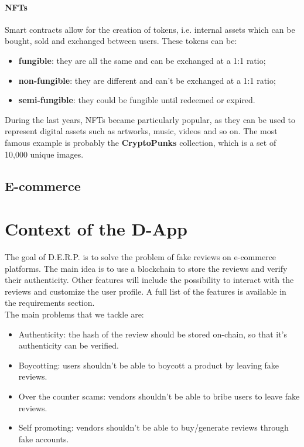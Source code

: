 \documentclass[12pt,a4paper,oneside]{article}
\theoremstyle{definition}
\begin{document}
\paragraph{NFTs} Smart contracts allow for the creation of tokens, i.e. internal assets which can be bought, sold and exchanged between users. These tokens can be:
\begin{itemize}
  \item \textbf{fungible}: they are all the same and can be exchanged at a 1:1 ratio;
  \item \textbf{non-fungible}: they are different and can't be exchanged at a 1:1 ratio;
  \item \textbf{semi-fungible}: they could be fungible until redeemed or expired.
\end{itemize}
During the last years, NFTs became particularly popular, as they can be used to represent digital assets such as artworks, music, videos and so on. The most famous example is probably the \textbf{CryptoPunks} collection, which is a set of 10,000 unique images.\\


\subsection{E-commerce}

\section{Context of the D-App}
The goal of D.E.R.P. is to solve the problem of fake reviews on e-commerce platforms. The main idea is to use a blockchain to store the reviews and verify their authenticity. Other features will include the possibility to interact with the reviews and customize the user profile. A full list of the features is available in the requirements section. \\
The main problems that we tackle are:
\begin{itemize}
	\item Authenticity: the hash of the review should be stored on-chain, so that it's authenticity can be verified.
	\item Boycotting: users shouldn't be able to boycott a product by leaving fake reviews.
	\item Over the counter scams: vendors shouldn't be able to bribe users to leave fake reviews.
	\item Self promoting: vendors shouldn't be able to buy/generate reviews through fake accounts.
\end{itemize}
\end{document}
